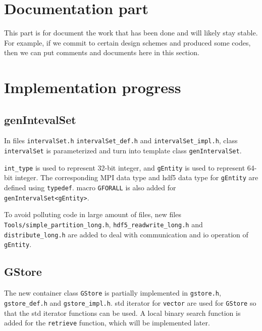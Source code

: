 \documentclass{article}
\begin{document}
% 
\section{Documentation part}
This part is for document the work that has been done and will likely
stay stable.  For example, if we commit to certain design schemes and
produced some codes, then we can put comments and documents here in this
section.

\section{Implementation progress}
\subsection{genIntevalSet}
In files \texttt{intervalSet.h} \texttt{intervalSet\_def.h} and \texttt{intervalSet\_impl.h},
class \texttt{intervalSet} is parameterized and turn into template class
\texttt{genIntervalSet}. 

\texttt{int\_type} is used to represent 32-bit integer, and \texttt{gEntity} is used to
represent 64-bit integer. The corresponding MPI data type and hdf5
data type for \texttt{gEntity} are defined using \texttt{typedef}. macro \texttt{GFORALL}
is also added for \texttt{genIntervalSet<gEntity>}.

To avoid
polluting code in large amount of files, new files
\texttt{Tools/simple\_partition\_long.h}, \texttt{hdf5\_readwrite\_long.h} and
\texttt{distribute\_long.h} are added to deal with communication and io operation of
\texttt{gEntity}.

  
\subsection{GStore}
The new container class \texttt{GStore} is partially implemented in \texttt{gstore.h},
\texttt{gstore\_def.h} and \texttt{gstore\_impl.h}. 
std iterator for \texttt{vector} are used for \texttt{GStore} so that the std iterator functions
can be used. A local binary search function is added for the \texttt{retrieve}
function, which will be implemented later.
\end{document}
